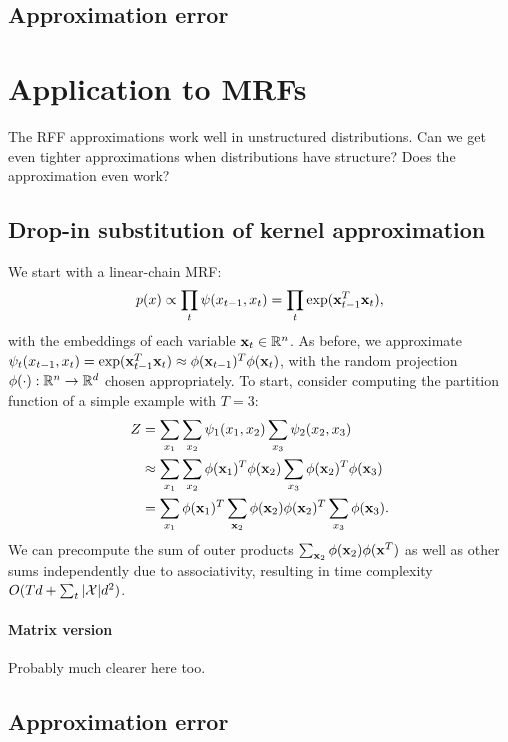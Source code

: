 \documentclass{article}
\begin{document}
\subsection{Approximation error}

\section{Application to MRFs}
The RFF approximations work well in unstructured distributions.
Can we get even tighter approximations when distributions have structure?
Does the approximation even work?

\subsection{Drop-in substitution of kernel approximation}
We start with a linear-chain MRF:
$$p(x) \propto \prod_t \psi(x_{t-1},x_t) = \prod_t \exp(\mathbf{x}_{t-1}^T\mathbf{x}_t),$$
with the embeddings of each variable $\mathbf{x}_t\in\mathbb{R}^n$.
As before, we approximate $\psi_t(x_{t-1}, x_t) = \exp(\mathbf{x}_{t-1}^T \mathbf{x}_t) \approx \phi(\mathbf{x}_{t-1})^T\phi(\mathbf{x}_t)$,
with the random projection $\phi(\cdot): \mathbb{R}^n \to \mathbb{R}^d$ chosen appropriately.
To start, consider computing the partition function of a simple example with $T=3$:
\begin{equation}
\begin{aligned}
Z
&= \sum_{x_1}\sum_{x_2} \psi_1(x_1, x_2) \sum_{x_3} \psi_2(x_2, x_3) \\
&\approx \sum_{x_1}\sum_{x_2} \phi(\mathbf{x}_1)^T\phi(\mathbf{x}_2) \sum_{x_3} \phi(\mathbf{x}_2)^T\phi(\mathbf{x}_3)\\
&= \sum_{x_1} \phi(\mathbf{x}_1)^T \sum_{\mathbf{x}_2} \phi(\mathbf{x}_2)\phi(\mathbf{x}_2)^T \sum_{x_3}\phi(\mathbf{x}_3).
\end{aligned}
\end{equation}
We can precompute the sum of outer products $\sum_{\mathbf{x}_2}\phi(\mathbf{x}_2)\phi(\mathbf{x}^T)$
as well as other sums independently due to associativity,
resulting in time complexity $O(Td + \sum_t |\mathcal{X}|d^2)$.

\paragraph{Matrix version}
Probably much clearer here too.

\subsection{Approximation error}




\end{document}
